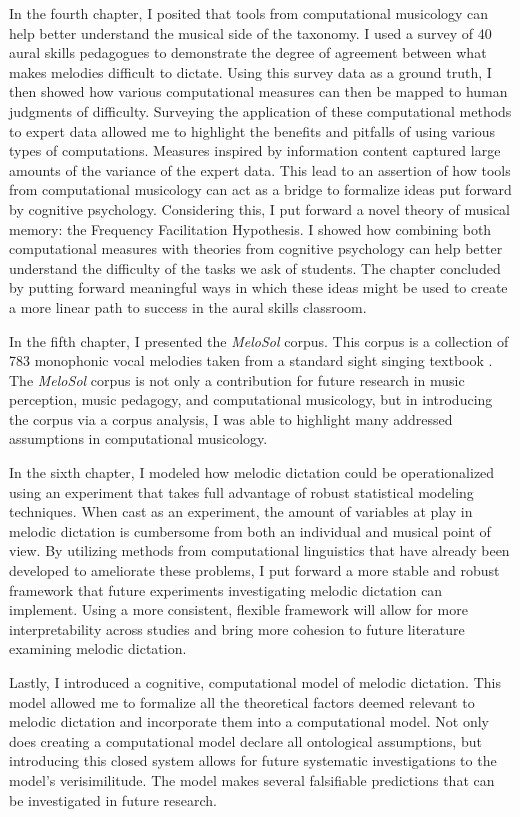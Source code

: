 \documentclass[12pt,]{book}
\begin{document}
In the fourth chapter, I posited that tools from computational musicology can help better understand the musical side of the taxonomy.
I used a survey of 40 aural skills pedagogues to demonstrate the degree of agreement between what makes melodies difficult to dictate.
Using this survey data as a ground truth, I then showed how various computational measures can then be mapped to human judgments of difficulty.
Surveying the application of these computational methods to expert data allowed me to highlight the benefits and pitfalls of using various types of computations.
Measures inspired by information content captured large amounts of the variance of the expert data.
This lead to an assertion of how tools from computational musicology can act as a bridge to formalize ideas put forward by cognitive psychology.
Considering this, I put forward a novel theory of musical memory: the Frequency Facilitation Hypothesis.
I showed how combining both computational measures with theories from cognitive psychology can help better understand the difficulty of the tasks we ask of students.
The chapter concluded by putting forward meaningful ways in which these ideas might be used to create a more linear path to success in the aural skills classroom.

In the fifth chapter, I presented the \emph{MeloSol} corpus.
This corpus is a collection of 783 monophonic vocal melodies taken from a standard sight singing textbook \citep{berkowitzNewApproachSight2011}.
The \emph{MeloSol} corpus is not only a contribution for future research in music perception, music pedagogy, and computational musicology, but in introducing the corpus via a corpus analysis, I was able to highlight many addressed assumptions in computational musicology.

In the sixth chapter, I modeled how melodic dictation could be operationalized using an experiment that takes full advantage of robust statistical modeling techniques.
When cast as an experiment, the amount of variables at play in melodic dictation is cumbersome from both an individual and musical point of view.
By utilizing methods from computational linguistics that have already been developed to ameliorate these problems, I put forward a more stable and robust framework that future experiments investigating melodic dictation can implement.
Using a more consistent, flexible framework will allow for more interpretability across studies and bring more cohesion to future literature examining melodic dictation.

Lastly, I introduced a cognitive, computational model of melodic dictation.
This model allowed me to formalize all the theoretical factors deemed relevant to melodic dictation and incorporate them into a computational model.
Not only does creating a computational model declare all ontological assumptions, but introducing this closed system allows for future systematic investigations to the model's verisimilitude.
The model makes several falsifiable predictions that can be investigated in future research.
\end{document}
